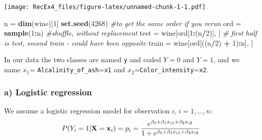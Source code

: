\documentclass[]{article}
\newenvironment{Shaded}{\begin{snugshade}}{\end{snugshade}}
\newcommand{\KeywordTok}[1]{\textcolor[rgb]{0.13,0.29,0.53}{\textbf{#1}}}
\newcommand{\DecValTok}[1]{\textcolor[rgb]{0.00,0.00,0.81}{#1}}
\newcommand{\StringTok}[1]{\textcolor[rgb]{0.31,0.60,0.02}{#1}}
\newcommand{\CommentTok}[1]{\textcolor[rgb]{0.56,0.35,0.01}{\textit{#1}}}
\newcommand{\OperatorTok}[1]{\textcolor[rgb]{0.81,0.36,0.00}{\textbf{#1}}}
\newcommand{\NormalTok}[1]{#1}
\begin{document}
\texttt{[image: RecEx4\_files/figure-latex/unnamed-chunk-1-1.pdf]}

\begin{Shaded}
\begin{Highlighting}[]
\NormalTok{n =}\StringTok{ }\KeywordTok{dim}\NormalTok{(wine)[}\DecValTok{1}\NormalTok{]}
\KeywordTok{set.seed}\NormalTok{(}\DecValTok{4268}\NormalTok{)  }\CommentTok{#to get the same order if you rerun}
\NormalTok{ord =}\StringTok{ }\KeywordTok{sample}\NormalTok{(}\DecValTok{1}\OperatorTok{:}\NormalTok{n)  }\CommentTok{#shuffle, without replacement }
\NormalTok{test =}\StringTok{ }\NormalTok{wine[ord[}\DecValTok{1}\OperatorTok{:}\NormalTok{(n}\OperatorTok{/}\DecValTok{2}\NormalTok{)], ]  }\CommentTok{# first half is test, second train - could have been opposite}
\NormalTok{train =}\StringTok{ }\NormalTok{wine[ord[((n}\OperatorTok{/}\DecValTok{2}\NormalTok{) }\OperatorTok{+}\StringTok{ }\DecValTok{1}\NormalTok{)}\OperatorTok{:}\NormalTok{n], ]}
\end{Highlighting}
\end{Shaded}

In our data the two classes are named \texttt{y} and coded \(Y=0\) and
\(Y=1\), and we name \(x_1\)= \texttt{Alcalinity\_of\_ash}=\texttt{x1}
and \(x_2\)=\texttt{Color\_intensity}=\texttt{x2}.

\subsubsection{a) Logistic regression}\label{a-logistic-regression}

We assume a logistic regression model for observation \(i\),
\(i=1,\ldots,n\): \[
P(Y_i = 1| {\bf X}={\bf x}_i) = p_i = \frac{e^{\beta_0 + \beta_1x_{i1} + \beta_2 x_{i2}}}{ 1+ e^{\beta_0 + \beta_1x_{i1} + \beta_2x_{i2}}}
\]
\end{document}
